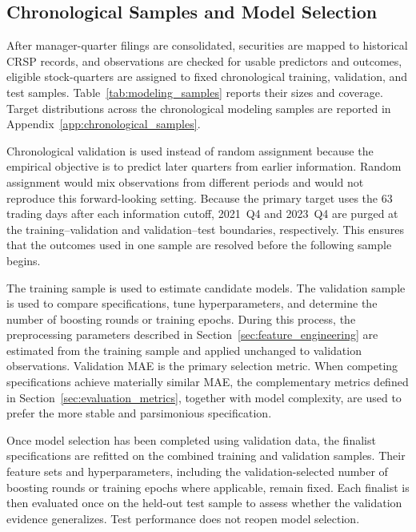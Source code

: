 \subsection{Chronological Samples and Model Selection}
\label{sec:chronological_samples}

After manager-quarter filings are consolidated, securities are mapped to historical CRSP records, and observations are checked for usable predictors and outcomes, eligible stock-quarters are assigned to fixed chronological training, validation, and test samples. Table~\ref{tab:modeling_samples} reports their sizes and coverage. Target distributions across the chronological modeling samples are reported in Appendix~\ref{app:chronological_samples}.



\noindent
Chronological validation is used instead of random assignment because the empirical objective is to predict later quarters from earlier information. Random assignment would mix observations from different periods and would not reproduce this forward-looking setting. Because the primary target uses the 63 trading days after each information cutoff, 2021~Q4 and 2023~Q4 are purged at the training--validation and validation--test boundaries, respectively. This ensures that the outcomes used in one sample are resolved before the following sample begins.

The training sample is used to estimate candidate models. The validation sample is used to compare specifications, tune hyperparameters, and determine the number of boosting rounds or training epochs. During this process, the preprocessing parameters described in Section~\ref{sec:feature_engineering} are estimated from the training sample and applied unchanged to validation observations. Validation MAE is the primary selection metric. When competing specifications achieve materially similar MAE, the complementary metrics defined in Section~\ref{sec:evaluation_metrics}, together with model complexity, are used to prefer the more stable and parsimonious specification.

Once model selection has been completed using validation data, the finalist specifications are refitted on the combined training and validation samples. Their feature sets and hyperparameters, including the validation-selected number of boosting rounds or training epochs where applicable, remain fixed. Each finalist is then evaluated once on the held-out test sample to assess whether the validation evidence generalizes. Test performance does not reopen model selection.

